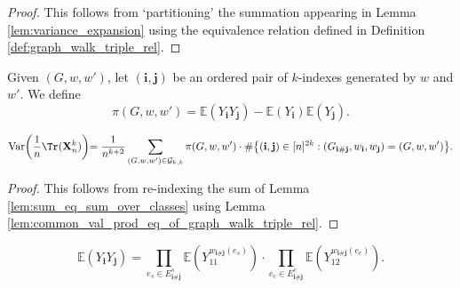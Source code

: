 \begin{proof}
  This follows from `partitioning' the summation appearing in Lemma \ref{lem:variance_expansion} using the equivalence relation defined in Definition \ref{def:graph_walk_triple_rel}.
\end{proof}


\begin{definition}
  \notready
  \label{def:common_val_prod}
  Given $(G,w,w')$, let $(\mathbf{i},\mathbf{j})$ be an ordered pair of $k$-indexes generated by $w$ and $w'$.
  We define
  \[
  \pi(G,w,w') = \mathbb{E}(Y_\mathbf{i} Y_\mathbf{j}) - \mathbb{E}(Y_\mathbf{i}) \mathbb{E}(Y_\mathbf{j}).
  \]
\end{definition}


\begin{lemma}
  \notready
  \label{lem:inner_sum_eq_common_val_prod_mul_card}
  \[
  \text{Var} \biggl(\frac{1}{n} \Tr (\mathbf{X}_n^k) \biggl)
  = \frac{1}{n^{k+2}} \sum_{(G,w,w') \in \mathcal{G}_{k,k}} \pi(G,w,w')
\cdot \# \bigl\{ (\mathbf{i},\mathbf{j}) \in [n]^{2k} : (G_{\mathbf{i} \# \mathbf{j}},w_\mathbf{i},w_\mathbf{j}) = (G,w,w') \bigl\}.
  \]
\end{lemma}

\begin{proof}
  This follows from re-indexing the sum of Lemma \ref{lem:sum_eq_sum_over_classes} using Lemma \ref{lem:common_val_prod_eq_of_graph_walk_triple_rel}.
\end{proof}


\begin{lemma}
  \notready
  \label{lem:expect_mul_eq_prod_expect_edgewise_of_indep}
  \[
  \mathbb{E} (Y_\mathbf{i}Y_\mathbf{j})
  = \prod_{e_s \in E^s_{\mathbf{i} \# \mathbf{j}}} \mathbb{E} (Y_{11}^{w_{\mathbf{i} \# \mathbf{j}}(e_s)}) \cdot \prod_{e_c \in E^c_{\mathbf{i} \# \mathbf{j}}} \mathbb{E} (Y_{12}^{w_{\mathbf{i} \# \mathbf{j}}(e_c)}).
  \]
\end{lemma}

